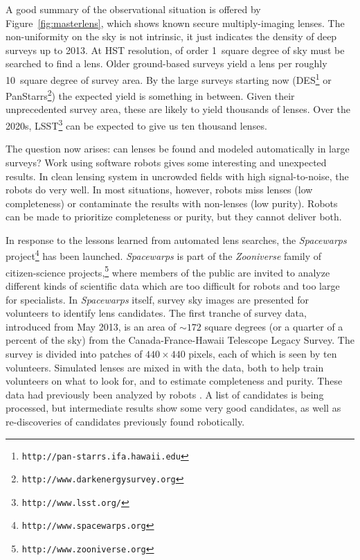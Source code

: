 \documentclass[12pt,preprint]{aastex}
\begin{document}
A good summary of the observational situation is offered by
Figure~\ref{fig:masterlens}, which shows known secure multiply-imaging
lenses.  The non-uniformity on the sky is not intrinsic, it just
indicates the density of deep surveys up to 2013.  At HST resolution,
of order 1~square degree of sky must be searched to find a lens.
Older ground-based surveys yield a lens per roughly 10~square degree
of survey area.  By the large surveys starting now
(DES\footnote{\tt http://pan-starrs.ifa.hawaii.edu} or
PanStarrs\footnote{\tt http://www.darkenergysurvey.org}) the expected
yield is something in between.  Given their unprecedented survey area,
these are likely to yield thousands of lenses.  Over the 2020s,
LSST\footnote{\tt http://www.lsst.org/} can be expected to give us ten
thousand lenses.

The question now arises: can lenses be found and modeled
automatically in large surveys?  Work using software robots
\citep{2009ApJ...694..924M} gives some interesting and unexpected
results.  In clean lensing system in uncrowded fields with high
signal-to-noise, the robots do very well.  In most situations,
however, robots miss lenses (low completeness) or contaminate the
results with non-lenses (low purity).  Robots can be made to
prioritize completeness or purity, but they cannot deliver both.

In response to the lessons learned from automated lens searches, the
{\em Spacewarps\/} project\footnote{\tt http://www.spacewarps.org}
 has been launched.  {\em Spacewarps\/} is
part of the {\em Zooniverse\/} family of citizen-science
projects,\footnote{\tt http://www.zooniverse.org} where members of the
public are invited to analyze different kinds of scientific data which
are too difficult for robots and too large for specialists.  In {\em
 Spacewarps\/} itself, survey sky images are presented for volunteers to identify lens candidates.  The first tranche of survey data, introduced from May 2013, is an area of $\sim172$ square
degrees (or a quarter of a percent of the sky) from the Canada-France-Hawaii Telescope Legacy Survey.
 The survey is divided into patches of $440\times 440$ pixels, each of
which is seen by ten volunteers.  Simulated lenses are mixed in with
the data, both to help train volunteers on what to look for, and to
estimate completeness and purity.
These data had previously been analyzed by robots \cite{Gavazzi2012, More2012ApJ}.  
  A list of candidates is being
processed, but intermediate results show some very good candidates, as
well as re-discoveries of candidates previously found robotically.
\end{document}
